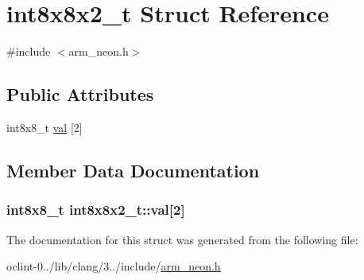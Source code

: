 \hypertarget{structint8x8x2__t}{\section{int8x8x2\-\_\-t Struct Reference}
\label{structint8x8x2__t}
}


{\ttfamily \#include $<$arm\-\_\-neon.\-h$>$}

\subsection*{Public Attributes}
\begin{DoxyCompactItemize}
\item 
int8x8\-\_\-t \hyperlink{structint8x8x2__t_adb90f69f4f95027e2e84243081315331}{val} \mbox{[}2\mbox{]}
\end{DoxyCompactItemize}


\subsection{Member Data Documentation}
\hypertarget{structint8x8x2__t_adb90f69f4f95027e2e84243081315331}{
\subsubsection[{val}]{\setlength{\rightskip}{0pt plus 5cm}int8x8\-\_\-t int8x8x2\-\_\-t\-::val\mbox{[}2\mbox{]}}}\label{structint8x8x2__t_adb90f69f4f95027e2e84243081315331}


The documentation for this struct was generated from the following file\-:\begin{DoxyCompactItemize}
\item 
oclint-\/0../lib/clang/3../include/\hyperlink{arm__neon_8h}{arm\-\_\-neon.\-h}\end{DoxyCompactItemize}
